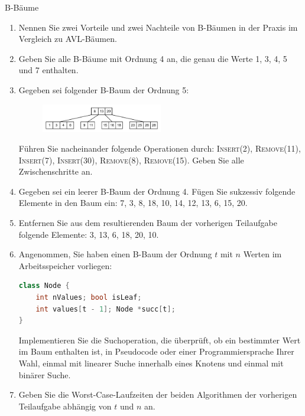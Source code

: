 \documentclass[11pt,a4paper]{article}
\begin{document}
\begin{aufgabe}{3}{B-Bäume}
    \begin{enumerate}
        \item
        Nennen Sie zwei Vorteile und zwei Nachteile von B-Bäumen in der Praxis im Vergleich zu AVL-Bäumen.

        \item Geben Sie alle B-Bäume mit Ordnung 4 an, die genau die Werte 1, 3, 4, 5 und 7 enthalten.
        
        \item
        Gegeben sei folgender B-Baum der Ordnung 5:
        \begin{figure}[h!]
            \centering
            \includegraphics[width=0.5\textwidth]{img/3d}
        \end{figure}
        \FloatBarrier
        Führen Sie nacheinander folgende Operationen durch: 
        \textsc{Insert(2)}, \textsc{Remove(11)}, \textsc{Insert(7)}, \textsc{Insert(30)}, \textsc{Remove(8)}, \textsc{Remove(15)}.
        Geben Sie alle Zwischenschritte an.

        \item Gegeben sei ein leerer B-Baum der Ordnung 4. Fügen Sie sukzessiv folgende Elemente in den Baum ein: 
        7, 3, 8, 18, 10, 14, 12, 13, 6, 15, 20.

        \item
        Entfernen Sie aus dem resultierenden Baum der vorherigen Teilaufgabe folgende Elemente:
        3, 13, 6, 18, 20, 10.

        \item Angenommen, Sie haben einen B-Baum der Ordnung $t$ mit $n$ Werten im Arbeitsspeicher vorliegen:
        \begin{lstlisting}[language=c++]
class Node {
    int nValues; bool isLeaf;
    int values[t - 1]; Node *succ[t];
}
        \end{lstlisting}
        Implementieren Sie die Suchoperation, die überprüft, ob ein bestimmter Wert im Baum enthalten ist, in Pseudocode oder einer Programmiersprache Ihrer Wahl, einmal mit linearer Suche innerhalb eines Knotens und einmal mit binärer Suche.

        \item Geben Sie die Worst-Case-Laufzeiten der beiden Algorithmen der vorherigen Teilaufgabe abhängig von $t$ und $n$ an.
    \end{enumerate}
\end{aufgabe}
\end{document}
